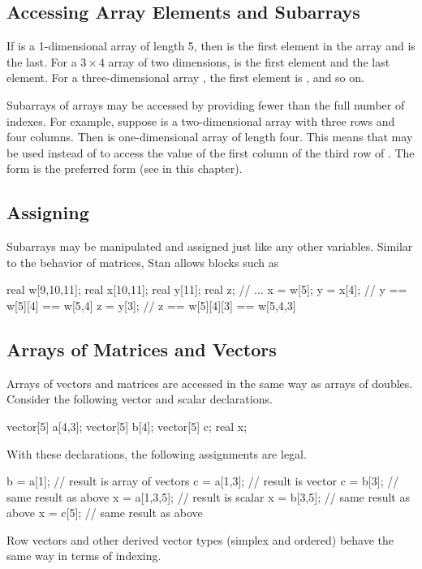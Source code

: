 \subsection{Accessing Array Elements and Subarrays}

If  is a 1-dimensional array of length 5, then  is
the first element in the array and  is the last.  For a $3
\times 4$ array  of two dimensions,  is the first
element and  the last element.  For a three-dimensional
array , the first element is , and so on.

Subarrays of arrays may be accessed by providing fewer than the full
number of indexes.  For example, suppose  is a two-dimensional
array with three rows and four columns.  Then  is
one-dimensional array of length four.  This means that 
may be used instead of  to access the value of the first
column of the third row of .  The form  is the
preferred form (see  in this chapter).

\subsection{Assigning}

Subarrays may be manipulated and assigned just like any other
variables.  Similar to the behavior of matrices, Stan allows blocks
such as
%
\begin{stancode}
real w[9,10,11];
real x[10,11];
real y[11];
real z;
// ...
x = w[5];
y = x[4];  // y == w[5][4] == w[5,4]
z = y[3];  // z == w[5][4][3] == w[5,4,3]
\end{stancode}
%


\subsection{Arrays of Matrices and Vectors}

Arrays of vectors and matrices are accessed in the same way as arrays
of doubles.  Consider the following vector and scalar declarations.
%
\begin{stancode}
vector[5] a[4,3];
vector[5] b[4];
vector[5] c;
real x;
\end{stancode}
%
With these declarations, the following assignments are legal.
%
\begin{stancode}
b = a[1];      // result is array of vectors
c = a[1,3];    // result is vector
c = b[3];      //   same result as above
x = a[1,3,5];  // result is scalar
x = b[3,5];    //   same result as above
x = c[5];      //   same result as above
\end{stancode}
%
Row vectors and other derived vector types (simplex and ordered)
behave the same way in terms of indexing.

